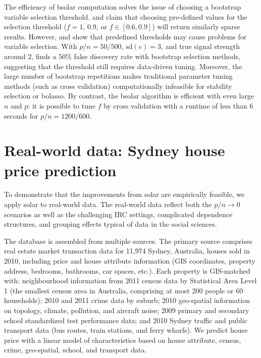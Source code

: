 \documentclass[11pt,review,authoryear]{elsarticle}
\begin{document}
The efficiency of bsolar computation solves the issue of choosing a bootstrap variable selection threshold. \citet{bach2008bolasso} and \citet{meinshausen2010stability} claim that choosing pre-defined values for the selection threshold ($f=1$, $0.9$, or $f\in\left[0.6,0.9\right]$) will return similarly sparse results. However, \citet{bach2008bolasso} and \citet{huang2014stat} show that predefined thresholds may cause problems for variable selection. With $p/n=50/500$, $\mathrm{sd}(e)=3$, and true signal strength around $2$, \citet{huang2014stat} finds a 50\% false discovery rate with bootstrap selection methods, suggesting that the threshold still requires data-driven tuning. Moreover, the large number of bootstrap repetitions makes traditional parameter tuning methods (such as cross validation) computationally infeasible for stability selection or bolasso. By contrast, the bsolar algorithm is efficient with even large $n$ and $p$: it is possible to tune $f$ by cross validation with a runtime of less than $6$ seconds for $p/n=1200/600$.

\section{Real-world data: Sydney house price prediction\label{section:application}}

To demonstrate that the improvements from solar are empirically feasible, we apply solar to real-world data. The real-world data reflect both the $p/n\rightarrow0$ scenarios as well as the challenging IRC settings, complicated dependence structures, and grouping effects typical of data in the social sciences.

The database is assembled from multiple sources. The primary source comprises real estate market transaction data for 11,974 Sydney, Australia, houses sold in 2010, including price and house attribute information (GIS coordinates, property address, bedrooms, bathrooms, car spaces, etc.). Each property is GIS-matched with: neighbourhood information from 2011 census data by Statistical Area Level 1 (the smallest census area in Australia, comprising at most 200 people or 60 households); 2010 and 2011 crime data by suburb; 2010 geo-spatial information on topology, climate, pollution, and aircraft noise; 2009 primary and secondary school standardized test performance data; and 2010 Sydney traffic and public transport data (bus routes, train stations, and ferry wharfs). We predict house price with a linear model of characteristics based on house attribute, census, crime, geo-spatial, school, and transport data.
\end{document}
